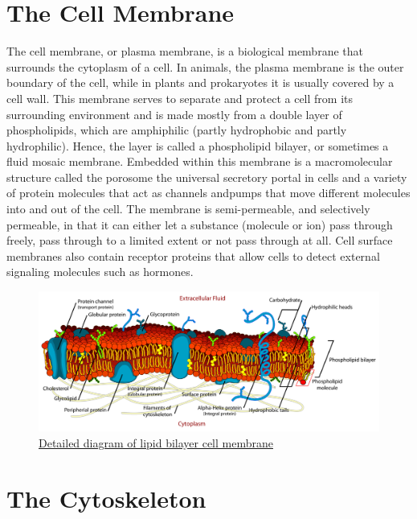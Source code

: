 \hypertarget{the-cell-membrane}{%
\section{The Cell Membrane}\label{the-cell-membrane}}

The cell membrane, or plasma membrane, is a biological membrane that surrounds the cytoplasm of a cell. In animals, the plasma membrane is the outer boundary of the cell, while in plants and prokaryotes it is usually covered by a cell wall. This membrane serves to separate and protect a cell from its surrounding environment and is made mostly from a double layer of phospholipids, which are amphiphilic (partly hydrophobic and partly hydrophilic). Hence, the layer is called a phospholipid bilayer, or sometimes a fluid mosaic membrane. Embedded within this membrane is a macromolecular structure called the porosome the universal secretory portal in cells and a variety of protein molecules that act as channels andpumps that move different molecules into and out of the cell. The membrane is semi-permeable, and selectively permeable, in that it can either let a substance (molecule or ion) pass through freely, pass through to a limited extent or not pass through at all. Cell surface membranes also contain receptor proteins that allow cells to detect external signaling molecules such as hormones.



\begin{figure}

{\centering \includegraphics[width=0.7\linewidth]{./figures/cells/Cell_membrane_detailed_diagram_en} 

}

\caption{\href{https://commons.wikimedia.org/wiki/File:Cell_membrane_detailed_diagram_en.svg}{Detailed diagram of lipid bilayer cell membrane}}\label{fig:cellmembrane}
\end{figure}

\hypertarget{the-cytoskeleton}{%
\section{The Cytoskeleton}\label{the-cytoskeleton}}

